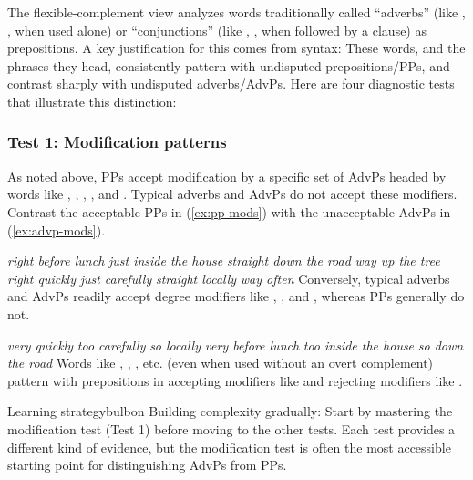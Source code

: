 The flexible-complement view analyzes words traditionally called ``adverbs'' (like , ,  when used alone) or ``conjunctions'' (like , ,  when followed by a clause) as prepositions. A key justification for this comes from syntax: These words, and the phrases they head, consistently pattern with undisputed prepositions/PPs, and contrast sharply with undisputed adverbs/AdvPs. Here are four diagnostic tests that illustrate this distinction:

\subsubsection*{Test 1: Modification patterns}
\label{sec:test-modification}

As noted above, PPs accept modification by a specific set of AdvPs headed by words like , , , , and . Typical adverbs and AdvPs do not accept these modifiers. Contrast the acceptable PPs in (\ref{ex:pp-mods}) with the unacceptable AdvPs in (\ref{ex:advp-mods}).

\ea\label{ex:pp-mods} %
   \ea \emph{right before lunch}
   \ex \emph{just inside the house}
   \ex \emph{straight down the road}
   \ex \emph{way up the tree}
   \z
\z
\ea\label{ex:advp-mods} %
   \ea *\emph{right quickly}
   \ex *\emph{just carefully}
   \ex *\emph{straight locally}
   \ex *\emph{way often}
\z
\z
Conversely, typical adverbs and AdvPs readily accept degree modifiers like , , and , whereas PPs generally do not.

\ea\label{ex:advp-mods2} 
   \ea \emph{very quickly}
   \ex \emph{too carefully}
   \ex \emph{so locally}
   \z
\z
\ea\label{ex:pp-mods2} %
   \ea *\emph{very before lunch}
   \ex *\emph{too inside the house}
   \ex *\emph{so down the road}
   \z
\z
Words like , , , etc. (even when used without an overt complement) pattern with prepositions in accepting modifiers like  and rejecting modifiers like .

\begin{tblsfilledsymbol}{Learning strategy}{bulbon}
Building complexity gradually: Start by mastering the modification test (Test 1) before moving to the other tests. Each test provides a different kind of evidence, but the modification test is often the most accessible starting point for distinguishing AdvPs from PPs.
\end{tblsfilledsymbol}

